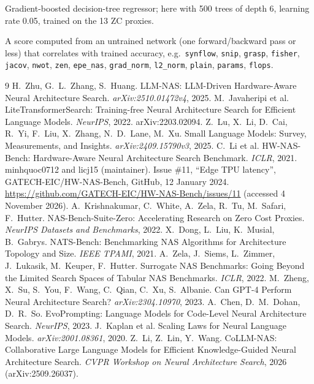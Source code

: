 \documentclass[11pt,a4paper]{article}
\newcommand{\code}[1]{\texttt{#1}}
\begin{document}
\begin{description}[style=nextline,leftmargin=0pt,itemsep=3pt]
\item[XGBoost.] Gradient-boosted decision-tree regressor; here with 500 trees of depth 6, learning rate 0.05, trained on the 13 ZC proxies.

\item[Zero-cost (ZC) proxy.] A score computed from an untrained network (one forward/backward pass or less) that correlates with trained accuracy, e.g.\ \code{synflow}, \code{snip}, \code{grasp}, \code{fisher}, \code{jacov}, \code{nwot}, \code{zen}, \code{epe\_nas}, \code{grad\_norm}, \code{l2\_norm}, \code{plain}, \code{params}, \code{flops}.
\end{description}

\begin{thebibliography}{9}
 H.~Zhu, G.~L.~Zhang, S.~Huang. LLM-NAS: LLM-Driven Hardware-Aware Neural Architecture Search. \emph{arXiv:2510.01472v4}, 2025.
 M.~Javaheripi et al. LiteTransformerSearch: Training-free Neural Architecture Search for Efficient Language Models. \emph{NeurIPS}, 2022. arXiv:2203.02094.
 Z.~Lu, X.~Li, D.~Cai, R.~Yi, F.~Liu, X.~Zhang, N.~D.~Lane, M.~Xu. Small Language Models: Survey, Measurements, and Insights. \emph{arXiv:2409.15790v3}, 2025.
 C.~Li et al. HW-NAS-Bench: Hardware-Aware Neural Architecture Search Benchmark. \emph{ICLR}, 2021.
 minhquoc0712 and licj15 (maintainer). Issue \#11, ``Edge TPU latency'', GATECH-EIC/HW-NAS-Bench, GitHub, 12 January 2024. \url{https://github.com/GATECH-EIC/HW-NAS-Bench/issues/11} (accessed 4 November 2026).
 A.~Krishnakumar, C.~White, A.~Zela, R.~Tu, M.~Safari, F.~Hutter. NAS-Bench-Suite-Zero: Accelerating Research on Zero Cost Proxies. \emph{NeurIPS Datasets and Benchmarks}, 2022.
 X.~Dong, L.~Liu, K.~Musial, B.~Gabrys. NATS-Bench: Benchmarking NAS Algorithms for Architecture Topology and Size. \emph{IEEE TPAMI}, 2021.
 A.~Zela, J.~Siems, L.~Zimmer, J.~Lukasik, M.~Keuper, F.~Hutter. Surrogate NAS Benchmarks: Going Beyond the Limited Search Spaces of Tabular NAS Benchmarks. \emph{ICLR}, 2022.
 M.~Zheng, X.~Su, S.~You, F.~Wang, C.~Qian, C.~Xu, S.~Albanie. Can GPT-4 Perform Neural Architecture Search? \emph{arXiv:2304.10970}, 2023.
 A.~Chen, D.~M.~Dohan, D.~R.~So. EvoPrompting: Language Models for Code-Level Neural Architecture Search. \emph{NeurIPS}, 2023.
 J.~Kaplan et al. Scaling Laws for Neural Language Models. \emph{arXiv:2001.08361}, 2020.
 Z.~Li, Z.~Lin, Y.~Wang. CoLLM-NAS: Collaborative Large Language Models for Efficient Knowledge-Guided Neural Architecture Search. \emph{CVPR Workshop on Neural Architecture Search}, 2026 (arXiv:2509.26037).

\end{thebibliography}
\end{document}
